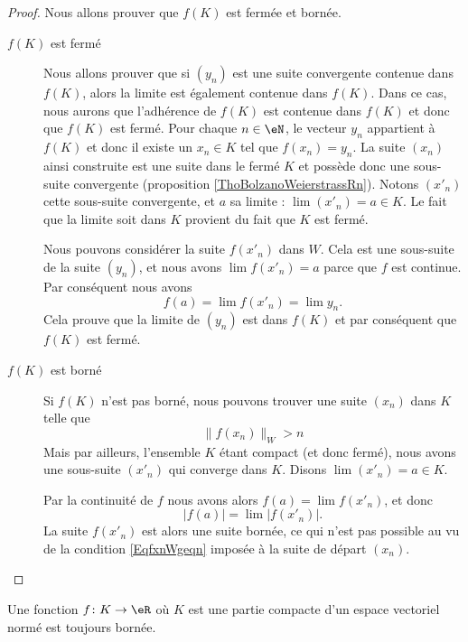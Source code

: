 \begin{proof}
	Nous allons prouver que $f(K)$ est fermée et bornée.
	\begin{description}
		\item[$f(K)$ est fermé] Nous allons prouver que si $(y_n)$ est une suite convergente contenue dans $f(K)$, alors la limite est également contenue dans $f(K)$. Dans ce cas, nous aurons que l'adhérence de $f(K)$ est contenue dans $f(K)$ et donc que $f(K)$ est fermé. Pour chaque $n\in\eN$, le vecteur $y_n$ appartient à $f(K)$ et donc il existe un $x_n\in K$ tel que $f(x_n)=y_n$. La suite $(x_n)$ ainsi construite est une suite dans le fermé $K$ et possède donc une sous-suite convergente (proposition \ref{ThoBolzanoWeierstrassRn}). Notons $(x'_n)$ cette sous-suite convergente, et $a$ sa limite : $\lim(x'_n)=a\in K$. Le fait que la limite soit dans $K$ provient du fait que $K$ est fermé.

			Nous pouvons considérer la suite $f(x'_n)$ dans $W$. Cela est une sous-suite de la suite $(y_n)$, et nous avons $\lim f(x'_n)=a$ parce que $f$ est continue. Par conséquent nous avons
			\begin{equation}
				f(a)=\lim f(x'_n)=\lim y_n.
			\end{equation}
			Cela prouve que la limite de $(y_n)$ est dans $f(K)$ et par conséquent que $f(K)$ est fermé.

		\item[$f(K)$ est borné]
			Si $f(K)$ n'est pas borné, nous pouvons trouver une suite $(x_n)$ dans $K$ telle que
			\begin{equation}		\label{EqfxnWgeqn}
				\| f(x_n) \|_W>n
			\end{equation}
			Mais par ailleurs, l'ensemble $K$ étant compact (et donc fermé), nous avons une sous-suite $(x'_n)$ qui converge dans $K$. Disons $\lim(x'_n)=a\in K$. 
			
			Par la continuité de $f$ nous avons alors $f(a)=\lim f(x'_n)$, et donc
			\begin{equation}
				| f(a) |=\lim | f(x'_n) |.
			\end{equation}
			La suite $f(x'_n)$ est alors une suite bornée, ce qui n'est pas possible au vu de la condition \eqref{EqfxnWgeqn} imposée à la suite de départ $(x_n)$.
	\end{description}
\end{proof}

\begin{corollary}	\label{CorFnContinueCompactBorne}
	Une fonction $f\colon K\to \eR$ où $K$ est une partie compacte d'un espace vectoriel normé est toujours bornée.
\end{corollary}


